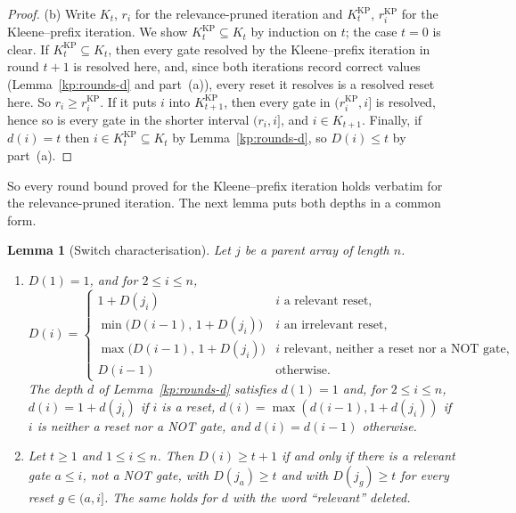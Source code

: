 \documentclass[11pt]{amsart}
\newtheorem{lemma}[theorem]{Lemma}
\theoremstyle{definition}
\theoremstyle{remark}
\begin{document}
\begin{proof}
(b) Write $K_t$, $r_i$ for the relevance-pruned iteration and $K^{\mathrm{KP}}_t$,
$r^{\mathrm{KP}}_i$ for the Kleene--prefix iteration. We show
$K^{\mathrm{KP}}_t\subseteq K_t$ by induction on $t$; the case $t=0$ is clear.
If $K^{\mathrm{KP}}_t\subseteq K_t$, then every gate resolved by the
Kleene--prefix iteration in round $t+1$ is resolved here, and, since both
iterations record correct values (Lemma~\ref{kp:rounds-d} and part~(a)), every
reset it resolves is a resolved reset here. So $r_i\ge r^{\mathrm{KP}}_i$. If it
puts $i$ into $K^{\mathrm{KP}}_{t+1}$, then every gate in
$(r^{\mathrm{KP}}_i,i]$ is resolved, hence so is every gate in the shorter
interval $(r_i,i]$, and $i\in K_{t+1}$. Finally, if $d(i)=t$ then
$i\in K^{\mathrm{KP}}_t\subseteq K_t$ by Lemma~\ref{kp:rounds-d}, so $D(i)\le t$
by part~(a).
\end{proof}

So every round bound proved for the Kleene--prefix iteration holds verbatim for
the relevance-pruned iteration. The next lemma puts both depths in a common
form.

\begin{lemma}[Switch characterisation]\label{kp:switch}
Let $j$ be a parent array of length $n$.
\begin{enumerate}[label=\textup{(\alph*)},leftmargin=2em]
\item $D(1)=1$, and for $2\le i\le n$,
  \[
    D(i)=\begin{cases}
      1+D(j_i) & \text{$i$ a relevant reset,}\\
      \min\bigl(D(i-1),\,1+D(j_i)\bigr) & \text{$i$ an irrelevant reset,}\\
      \max\bigl(D(i-1),\,1+D(j_i)\bigr) & \text{$i$ relevant, neither a
        reset nor a NOT gate,}\\
      D(i-1) & \text{otherwise.}
    \end{cases}
  \]
  The depth $d$ of Lemma~\ref{kp:rounds-d} satisfies $d(1)=1$ and, for
  $2\le i\le n$, $d(i)=1+d(j_i)$ if $i$ is a reset,
  $d(i)=\max(d(i-1),1+d(j_i))$ if $i$ is neither a reset nor a NOT gate, and
  $d(i)=d(i-1)$ otherwise.
\item Let $t\ge 1$ and $1\le i\le n$. Then $D(i)\ge t+1$ if and only if there
  is a relevant gate $a\le i$, not a NOT gate, with $D(j_a)\ge t$ and with
  $D(j_g)\ge t$ for every reset $g\in(a,i]$. The same holds for $d$ with the
  word ``relevant'' deleted.
\end{enumerate}
\end{lemma}
\end{document}

